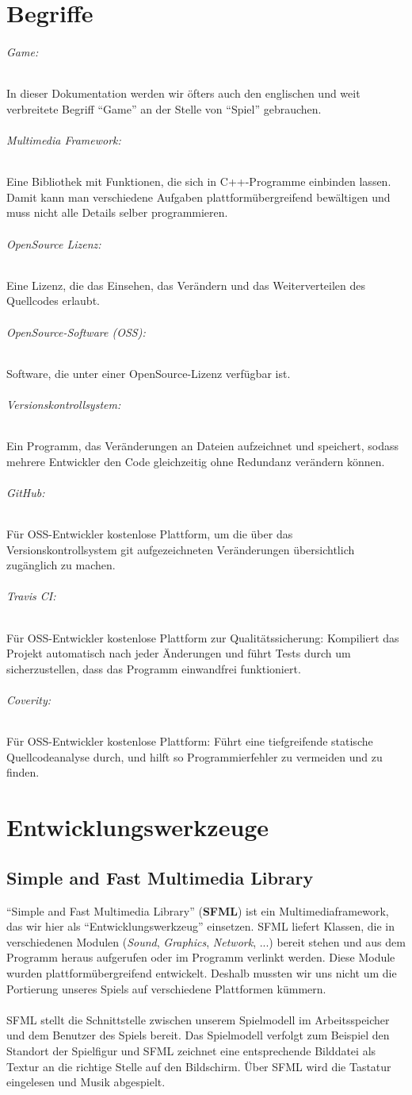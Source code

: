 \documentclass[11pt,a4paper]{scrbook}
\newcommand{\q}[1]{``#1''}
\begin{document}
\chapter{Begriffe}
\subparagraph{Game:}
In dieser Dokumentation werden wir öfters auch den englischen und weit verbreitete Begriff \q{Game} an der Stelle von \q{Spiel} gebrauchen.

\subparagraph{Multimedia Framework:}
Eine Bibliothek mit Funktionen, die sich in C++-Programme einbinden lassen. Damit kann man verschiedene Aufgaben plattformübergreifend bewältigen und muss nicht alle Details selber programmieren.

\subparagraph{OpenSource Lizenz:}

Eine Lizenz, die das Einsehen, das Verändern und das Weiterverteilen des Quellcodes erlaubt.

\subparagraph{OpenSource-Software (OSS):}
Software, die unter einer OpenSource-Lizenz verfügbar ist.

\subparagraph{Versionskontrollsystem:}
Ein Programm, das Veränderungen an Dateien aufzeichnet und speichert, sodass mehrere Entwickler den Code gleichzeitig ohne Redundanz verändern können.

\subparagraph{GitHub:}
Für OSS-Entwickler kostenlose Plattform, um die über das Versionskontrollsystem git aufgezeichneten Veränderungen übersichtlich zugänglich zu machen.

\subparagraph{Travis CI:}
Für OSS-Entwickler kostenlose Plattform zur Qualitätssicherung: Kompiliert das Projekt automatisch nach jeder Änderungen und führt Tests durch um sicherzustellen, dass das Programm einwandfrei funktioniert.

\subparagraph{Coverity:}
Für OSS-Entwickler kostenlose Plattform: Führt eine tiefgreifende statische Quellcodeanalyse durch, und hilft so Programmierfehler zu vermeiden und zu finden.

\chapter{Entwicklungswerkzeuge}
\section{Simple and Fast Multimedia Library}
\q{Simple and Fast Multimedia Library} (\textbf{SFML}) ist ein Multimediaframework, das wir hier als
\q{Entwicklungswerkzeug} einsetzen.
SFML liefert Klassen, die in verschiedenen Modulen (\textit{Sound}, \textit{Graphics}, \textit{Network}, ...) bereit stehen und aus dem Programm heraus aufgerufen oder im Programm verlinkt werden.
Diese Module wurden plattformübergreifend entwickelt. Deshalb mussten wir uns nicht um die Portierung unseres Spiels auf verschiedene Plattformen kümmern.
\\
\\
SFML stellt die Schnittstelle zwischen unserem Spielmodell im Arbeitsspeicher und dem Benutzer des Spiels bereit. Das Spielmodell verfolgt zum Beispiel den Standort der Spielfigur und SFML zeichnet eine entsprechende Bilddatei als Textur an die richtige Stelle auf den Bildschirm. Über SFML wird die Tastatur eingelesen und Musik abgespielt.
\end{document}
